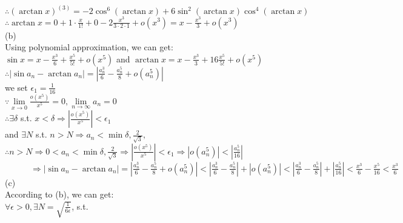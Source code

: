 \documentclass{article}
\begin{document}
$\therefore$\qquad$(\arctan x)^{(3)}=-2\cos^6(\arctan x) +6\sin^2(\arctan x)\cos^4(\arctan x)$\\

$\therefore$\qquad$\displaystyle\arctan x=0+1\cdot\frac{x}{1!}+0-2\frac{x^3}{3\cdot2\cdot1}+o(x^3)=x-\frac{x^3}{3}+o(x^3)$\\

(b)\\

Using polynomial approximation, we can get:\\

$\displaystyle\sin x=x-\frac{x^3}{6}+\frac{x^5}{5!}+o(x^5)$ and $\displaystyle\arctan x=x-\frac{x^3}{3}+16\frac{x^5}{5!}+o(x^5)$\\

$\therefore$\qquad$\displaystyle|\sin a_n-\arctan a_n|=|\frac{a_n^3}{6}-\frac{a_n^5}{8}+o(a_n^5)|$\\

we set $\epsilon_1=\displaystyle\frac{1}{16}$\\

$\because$\qquad$\lim \limits_{x \to 0}\displaystyle\frac{o(x^5)}{x^5}=0, \lim \limits_{n \to \infty}a_n=0$\\

$\therefore$\qquad$\exists\delta$ s.t. $\displaystyle x<\delta\Rightarrow\left|\frac{o(x^5)}{x^5}\right|<\epsilon_1$\\

\qquad\quad and $\exists N$ s.t. $n>N\Rightarrow a_n<\min{\delta,\displaystyle\frac{2}{\sqrt{3}}},$\\

$\therefore$\qquad$n>N\Rightarrow 0<a_n<\min{\delta,\displaystyle\frac{2}{\sqrt{3}}}\Rightarrow\left|\frac{o(x^5)}{x^5}\right|<\epsilon_1\Rightarrow |o(a_n^5)|<\left|\displaystyle\frac{a_n^5}{16}\right|$\\

$\qquad\quad\Rightarrow\displaystyle|\sin a_n-\arctan a_n|=|\frac{a_n^3}{6}-\frac{a_n^5}{8}+o(a_n^5)|<|\frac{a_n^3}{6}-\frac{a_n^5}{8}|+|o(a_n^5)|<|\frac{a_n^3}{6}-\frac{a_n^5}{8}|+\left|\displaystyle\frac{a_n^5}{16}\right|<\displaystyle\frac{x^3}{6}-\frac{x^5}{16}<\displaystyle\frac{x^3}{6}$\\

(c)\\

According to (b), we can get:\\

$\forall\epsilon>0, \exists N=\sqrt{\displaystyle\frac{1}{6\epsilon}}$, s.t.\\
\end{document}
